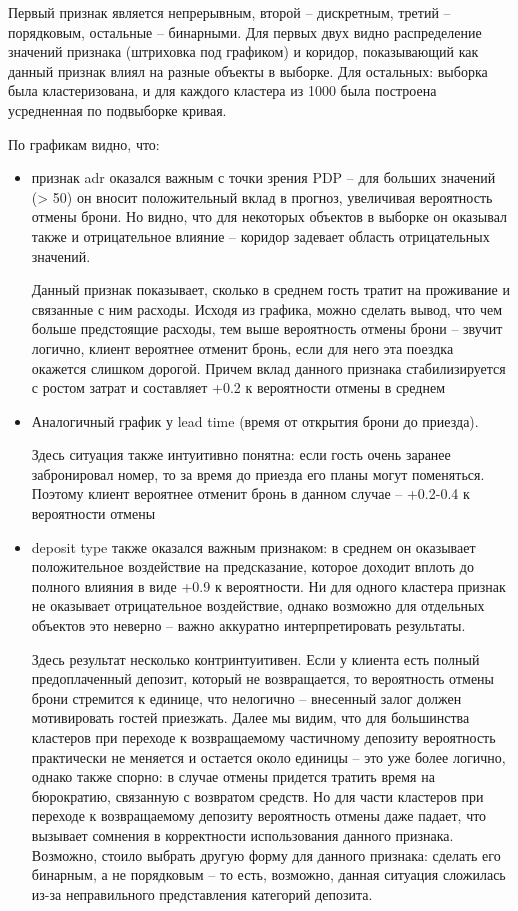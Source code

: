 Первый признак является непрерывным, второй --  дискретным, третий -- порядковым, остальные -- бинарными. Для первых двух видно распределение значений признака (штриховка под графиком) и коридор, показывающий как данный признак влиял на разные объекты в выборке. Для остальных: выборка была кластеризована, и для каждого кластера из 1000 была построена усредненная по подвыборке кривая.

По графикам видно, что:
\begin{itemize}
	\item признак adr оказался важным с точки зрения PDP -- для больших значений (> 50) он вносит положительный вклад в прогноз, увеличивая вероятность отмены брони. Но видно, что для некоторых объектов в выборке он оказывал также и отрицательное влияние -- коридор задевает область отрицательных значений.
	
	Данный признак показывает, сколько в среднем гость тратит на проживание и связанные с ним расходы. Исходя из графика, можно сделать вывод, что чем больше предстоящие расходы, тем выше вероятность отмены брони -- звучит логично, клиент вероятнее отменит бронь, если для него эта поездка окажется слишком дорогой. Причем вклад данного признака стабилизируется с ростом затрат и составляет +0.2 к вероятности отмены в среднем
	
	\item Аналогичный график у lead time (время от открытия брони до приезда).
	
	Здесь ситуация также интуитивно понятна: если гость очень заранее забронировал номер, то за время до приезда его планы могут поменяться. Поэтому клиент вероятнее отменит бронь в данном случае -- +0.2-0.4 к вероятности отмены
	
	\item deposit type также оказался важным признаком: в среднем он оказывает положительное воздействие на предсказание, которое доходит вплоть до полного влияния в виде +0.9 к вероятности. Ни для одного кластера признак не оказывает отрицательное воздействие, однако возможно для отдельных объектов это неверно -- важно аккуратно интерпретировать результаты.
	
	Здесь результат несколько контринтуитивен. Если у клиента есть полный предоплаченный депозит, который не возвращается, то вероятность отмены брони стремится к единице, что нелогично -- внесенный залог должен мотивировать гостей приезжать. Далее мы видим, что для большинства кластеров при переходе к возвращаемому частичному депозиту вероятность практически не меняется и остается около единицы -- это уже более логично, однако также спорно: в случае отмены придется тратить время на бюрократию, связанную с возвратом средств. Но для части кластеров при переходе к возвращаемому депозиту вероятность отмены даже падает, что вызывает сомнения в корректности использования данного признака. Возможно, стоило выбрать другую форму для данного признака: сделать его бинарным, а не порядковым -- то есть, возможно, данная ситуация сложилась из-за неправильного представления категорий депозита.
	

\end{itemize}
